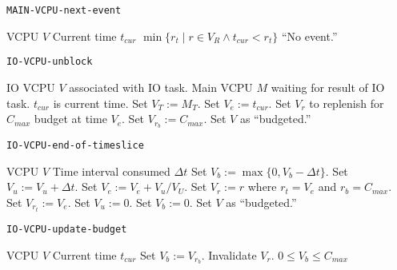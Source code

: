 \documentclass{article}
\begin{document}
\begin{algorithm}
  \caption{\tt MAIN-VCPU-next-event}\label{alg:vcpu_nextevent}
  \begin{algorithmic}[1]
    \REQUIRE VCPU $V$
    \REQUIRE Current time $t_{cur}$
    \RETURN $\min\{r_t \mid r\in V_R\wedge t_{cur}<r_t\}$ \OR ``No event.''
  \end{algorithmic}
\end{algorithm}

\begin{algorithm}
  \caption{\tt IO-VCPU-unblock}\label{alg:iovcpu_unblock}
  \begin{algorithmic}[1]
    \REQUIRE IO VCPU $V$ associated with IO task.
    \REQUIRE Main VCPU $M$ waiting for result of IO task.
    \REQUIRE $t_{cur}$ is current time.
    \STATE Set $V_T:=M_T$.
    \ENDIF
    \STATE Set $V_e:=t_{cur}$.
    \ENDIF
    \STATE Set $V_r$ to replenish for $C_{max}$ budget at time $V_e$.
    \ENDIF
    \ELSE
    \STATE Set $V_{r_b}:=C_{max}$.
    \ENDIF
    \STATE Set $V$ as ``budgeted.''
  \end{algorithmic}
\end{algorithm}

\begin{algorithm}
  \caption{\tt IO-VCPU-end-of-timeslice}\label{alg:iovcpu_eot}
  \begin{algorithmic}[1]
    \REQUIRE VCPU $V$
    \REQUIRE Time interval consumed $\Delta t$
    \STATE Set $V_b:=\max\{0,V_b-\Delta t\}$.
    \STATE Set $V_u:=V_u+\Delta t$.
    \STATE Set $V_e:=V_e+V_u/V_U$.
    \STATE Set $V_r:=r$ where $r_t=V_e$ and $r_b=C_{max}$.
    \ELSE
    \STATE Set $V_{r_t}:=V_e$.
    \ENDIF
    \STATE Set $V_u:=0$.
    \STATE Set $V_b:=0$.
    \STATE Set $V$ as \NOT ``budgeted.''
    \ENDIF
    \ENDIF
  \end{algorithmic}
\end{algorithm}

\begin{algorithm}
  \caption{\tt IO-VCPU-update-budget}\label{alg:iovcpu_upbudg}
  \begin{algorithmic}[1]
    \REQUIRE VCPU $V$
    \REQUIRE Current time $t_{cur}$
    \STATE Set $V_b:=V_{r_b}$.
    \STATE Invalidate $V_r$.
    \ENDIF
    \ENSURE $0\leq V_b\leq C_{max}$
  \end{algorithmic}
\end{algorithm}
\end{document}
